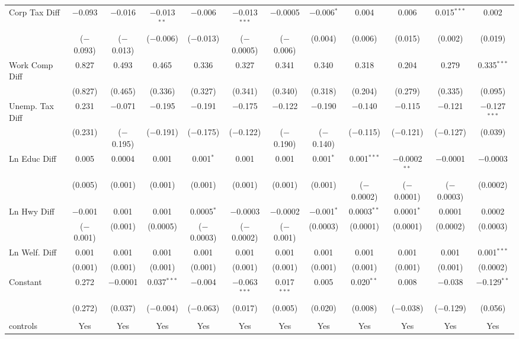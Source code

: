 \begin{table}[!htbp]
\begin{tabular}{@{\extracolsep{5pt}}lccccccccccc}
  Corp Tax Diff & $-$0.093 & $-$0.016 & $-$0.013$^{**}$ & $-$0.006 & $-$0.013$^{***}$ & $-$0.0005 & $-$0.006$^{*}$ & 0.004 & 0.006 & 0.015$^{***}$ & 0.002 \\ 
  & ($-$0.093) & ($-$0.013) & ($-$0.006) & ($-$0.013) & ($-$0.0005) & ($-$0.006) & (0.004) & (0.006) & (0.015) & (0.002) & (0.019) \\ 
  Work Comp Diff & 0.827 & 0.493 & 0.465 & 0.336 & 0.327 & 0.341 & 0.340 & 0.318 & 0.204 & 0.279 & 0.335$^{***}$ \\ 
  & (0.827) & (0.465) & (0.336) & (0.327) & (0.341) & (0.340) & (0.318) & (0.204) & (0.279) & (0.335) & (0.095) \\ 
  Unemp. Tax Diff & 0.231 & $-$0.071 & $-$0.195 & $-$0.191 & $-$0.175 & $-$0.122 & $-$0.190 & $-$0.140 & $-$0.115 & $-$0.121 & $-$0.127$^{***}$ \\ 
  & (0.231) & ($-$0.195) & ($-$0.191) & ($-$0.175) & ($-$0.122) & ($-$0.190) & ($-$0.140) & ($-$0.115) & ($-$0.121) & ($-$0.127) & (0.039) \\ 
  Ln Educ Diff & 0.005 & 0.0004 & 0.001 & 0.001$^{*}$ & 0.001 & 0.001 & 0.001$^{*}$ & 0.001$^{***}$ & $-$0.0002$^{**}$ & $-$0.0001 & $-$0.0003 \\ 
  & (0.005) & (0.001) & (0.001) & (0.001) & (0.001) & (0.001) & (0.001) & ($-$0.0002) & ($-$0.0001) & ($-$0.0003) & (0.0002) \\ 
  Ln Hwy Diff & $-$0.001 & 0.001 & 0.001 & 0.0005$^{*}$ & $-$0.0003 & $-$0.0002 & $-$0.001$^{*}$ & 0.0003$^{**}$ & 0.0001$^{*}$ & 0.0001 & 0.0002 \\ 
  & ($-$0.001) & (0.001) & (0.0005) & ($-$0.0003) & ($-$0.0002) & ($-$0.001) & (0.0003) & (0.0001) & (0.0001) & (0.0002) & (0.0003) \\ 
  Ln Welf. Diff & 0.001 & 0.001 & 0.001 & 0.001 & 0.001 & 0.001 & 0.001 & 0.001 & 0.001 & 0.001 & 0.001$^{***}$ \\ 
  & (0.001) & (0.001) & (0.001) & (0.001) & (0.001) & (0.001) & (0.001) & (0.001) & (0.001) & (0.001) & (0.0002) \\ 
  Constant & 0.272 & $-$0.0001 & 0.037$^{***}$ & $-$0.004 & $-$0.063$^{***}$ & 0.017$^{***}$ & 0.005 & 0.020$^{**}$ & 0.008 & $-$0.038 & $-$0.129$^{**}$ \\ 
  & (0.272) & (0.037) & ($-$0.004) & ($-$0.063) & (0.017) & (0.005) & (0.020) & (0.008) & ($-$0.038) & ($-$0.129) & (0.056) \\ 
 \hline \\[-1.8ex] 
controls & Yes & Yes & Yes & Yes & Yes & Yes & Yes & Yes & Yes & Yes & Yes \\ 

\end{tabular}
\end{table}
